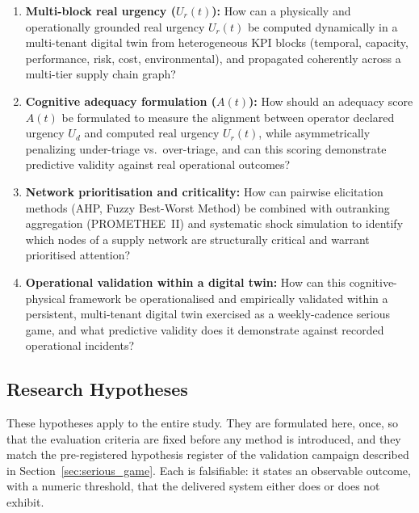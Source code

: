 \begin{enumerate}[label=\textbf{RQ\arabic*}., leftmargin=*]
  \item \textbf{Multi-block real urgency ($U_r(t)$):}
  How can a physically and operationally grounded real urgency $U_r(t)$ be computed dynamically in a multi-tenant digital twin from heterogeneous KPI blocks (temporal, capacity, performance, risk, cost, environmental), and propagated coherently across a multi-tier supply chain graph?

  \item \textbf{Cognitive adequacy formulation ($A(t)$):}
  How should an adequacy score $A(t)$ be formulated to measure the alignment between operator declared urgency $U_d$ and computed real urgency $U_r(t)$, while asymmetrically penalizing under-triage vs.\ over-triage, and can this scoring demonstrate predictive validity against real operational outcomes?

  \item \textbf{Network prioritisation and criticality:}
  How can pairwise elicitation methods (AHP, Fuzzy Best-Worst Method) be combined with outranking aggregation (PROMETHEE~II) and systematic shock simulation to identify which nodes of a supply network are structurally critical and warrant prioritised attention?

  \item \textbf{Operational validation within a digital twin:}
  How can this cognitive-physical framework be operationalised and empirically validated within a persistent, multi-tenant digital twin exercised as a weekly-cadence serious game, and what predictive validity does it demonstrate against recorded operational incidents?
\end{enumerate}

\subsection{Research Hypotheses}
\label{sec:hypotheses}

These hypotheses apply to the entire study. They are formulated here, once, so that the evaluation criteria are fixed before any method is introduced, and they match the pre-registered hypothesis register of the validation campaign described in Section~\ref{sec:serious_game}. Each is falsifiable: it states an observable outcome, with a numeric threshold, that the delivered system either does or does not exhibit.

